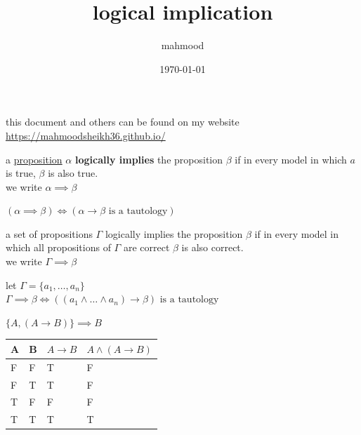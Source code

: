 \documentclass[a4paper,12pt]{article}
\author{mahmood}
\date{\today}
\title{logical implication}
\begin{document}
\maketitle
\begin{note}
this document and others can be found on my website\\
\url{https://mahmoodsheikh36.github.io/}
\end{note}
\begin{definition}
a \href{20230401175139-statement.org}{proposition} \(\alpha\) \textbf{logically implies} the proposition \(\beta\) if in every model in which \(a\) is true, \(\beta\) is also true.\\
we write \(\alpha \implies \beta\)\\
\begin{lemma}
\((\alpha \implies \beta) \iff (\alpha \to \beta \text{ is a tautology})\)\\
\end{lemma}
\end{definition}
\begin{definition}
a set of propositions \(\Gamma\) logically implies the proposition \(\beta\) if in every model in which all propositions of \(\Gamma\) are correct \(\beta\) is also correct.\\
we write \(\Gamma \implies \beta\)\\
\begin{lemma}
let \(\Gamma = \{a_1,\dots,a_n\}\)\\
\(\Gamma \implies \beta \iff ((a_1 \land \dots \land a_n) \to \beta) \text{ is a tautology}\)\\
\end{lemma}
\begin{my_example}
\(\{A,(A \to B)\} \implies B\)\\
\begin{tabular}{llll}
A & B & \(A \to B\) & \(A \land (A \to B)\)\\
\hline
F & F & T & F\\
F & T & T & F\\
T & F & F & F\\
T & T & T & T\\
\end{tabular}
\end{my_example}
\end{definition}
\end{document}
